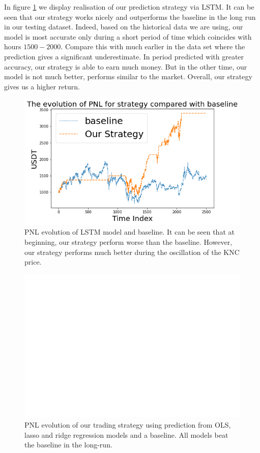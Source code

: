 \documentclass[twoside]{report}
\begin{document}
\begin{spacing}{1}
In figure \ref{fig:LSTM PNL} we display realisation of our prediction strategy via LSTM. It can be seen that our strategy works nicely and outperforms the baseline in the long run in our testing dataset. Indeed, based on the historical data we are using, our model is most accurate only during a short period of time which coincides with hours $1500-2000$. Compare this with much earlier in the data set where the prediction gives a significant underestimate. In period predicted with greater accuracy, our strategy is able to earn much money. But in the other time, our model is not much better, performs similar to the market. Overall, our strategy gives us a higher return.
\begin{figure}[!ht]
    \centering
    \includegraphics[scale = 0.7]{Images/LSTM PNL.png}
    \caption{PNL evolution of LSTM model and baseline. It can be seen that at beginning, our strategy perform worse than the baseline. However, our strategy performs much better during the oscillation of the KNC price.}
    \label{fig:LSTM PNL}
\end{figure}

\begin{figure}
    \centering
    \includegraphics[scale = 0.528]{Machine Learning/PnL_regress_various.png}
    \caption{PNL evolution of our trading strategy using prediction from OLS, lasso and ridge regression models and a baseline. All models beat the baseline in the long-run.}
    \label{fig:LR PNL}
\end{figure}




\end{spacing}
\end{document}
